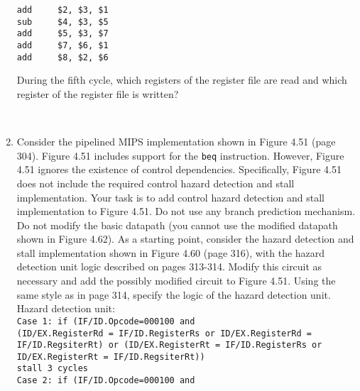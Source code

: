 \documentclass[10pt,letterpaper]{article}
\newcommand\tab[1][0.5cm]{\hspace*{#1}}
\begin{document}
\begin{enumerate}[label=\textbf{Problem \arabic*.}]
\begin{lstlisting}
add 	$2, $3, $1
sub 	$4, $3, $5
add 	$5, $3, $7
add 	$7, $6, $1
add 	$8, $2, $6
\end{lstlisting}
During the fifth cycle, which registers of the register file are read and which register of the register file is written?
\begin{center}
\end{center}
\\
\item Consider the pipelined MIPS implementation shown in Figure 4.51 (page 304). Figure 4.51 includes support for the \texttt{beq} instruction. However, Figure 4.51 ignores the existence of control dependencies. Specifically, Figure 4.51 does not include the required control hazard detection and stall implementation. Your task is to add control hazard detection and stall implementation to Figure 4.51. Do not use any branch prediction mechanism. Do not modify the basic datapath (you cannot use the modified datapath shown in Figure 4.62). As a starting point, consider the hazard detection and stall implementation shown in Figure 4.60 (page 316), with the hazard detection unit logic described on pages 313-314. Modify this circuit as necessary and add the possibly modified circuit to Figure 4.51. Using the same style as in page 314, specify the logic of the hazard detection unit.\\
Hazard detection unit: \\
\texttt{Case 1: if (IF/ID.Opcode=000100 and \\
\tab (ID/EX.RegisterRd = IF/ID.RegisterRs or ID/EX.RegisterRd = IF/ID.RegsiterRt) or (ID/EX.RegisterRt = IF/ID.RegisterRs or ID/EX.RegisterRt = IF/ID.RegsiterRt)) \\
\tab stall 3 cycles \\ 
Case 2: if (IF/ID.Opcode=000100 and \\
}
\end{enumerate}
\end{document}
